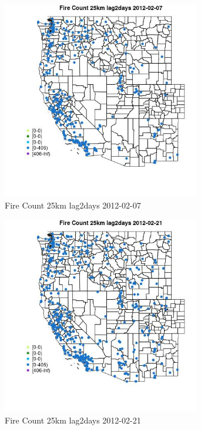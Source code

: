\begin{figure} 
\centering  
\includegraphics[width=0.77\textwidth]{Code_Outputs/Report_ML_input_PM25_Step4_part_f_de_duplicated_aves_prioritize_24hr_obswNAs_MapObsFire_Count_25km_lag2days2012-02-07.jpg} 
\caption{\label{fig:Report_ML_input_PM25_Step4_part_f_de_duplicated_aves_prioritize_24hr_obswNAsMapObsFire_Count_25km_lag2days2012-02-07}Fire Count 25km lag2days 2012-02-07} 
\end{figure} 
 

\begin{figure} 
\centering  
\includegraphics[width=0.77\textwidth]{Code_Outputs/Report_ML_input_PM25_Step4_part_f_de_duplicated_aves_prioritize_24hr_obswNAs_MapObsFire_Count_25km_lag2days2012-02-21.jpg} 
\caption{\label{fig:Report_ML_input_PM25_Step4_part_f_de_duplicated_aves_prioritize_24hr_obswNAsMapObsFire_Count_25km_lag2days2012-02-21}Fire Count 25km lag2days 2012-02-21} 
\end{figure} 
 

